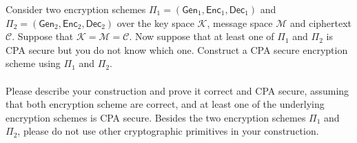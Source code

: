 \documentclass[12pt, letterpaper]{article}
\begin{document}
\begin{problem}{}
    Consider two encryption schemes 
$\Pi_1 = (\mathsf{Gen}_1, \mathsf{Enc}_1, \mathsf{Dec}_1)$ and 
$\Pi_2 = (\mathsf{Gen}_2, \mathsf{Enc}_2, \mathsf{Dec}_2)$ 
over the key space $\mathcal{K}$, message space $\mathcal{M}$ and ciphertext $\mathcal{C}$. 
Suppose that $\mathcal{K} = \mathcal{M} = \mathcal{C}$.
Now suppose that at least one of $\Pi_1$ and $\Pi_2$ is 
CPA secure but you do not know which one. 
Construct a CPA secure encryption scheme using $\Pi_1$ and $\Pi_2$.
\\\\
Please describe your construction and prove it correct and CPA secure, assuming that both encryption scheme are correct, and at least
one of the underlying encryption schemes is CPA secure.
Besides the two encryption schemes $\Pi_1$ and 
$\Pi_2$, 
please do not use other cryptographic 
primitives in your construction.
\end{problem}
\end{document}
